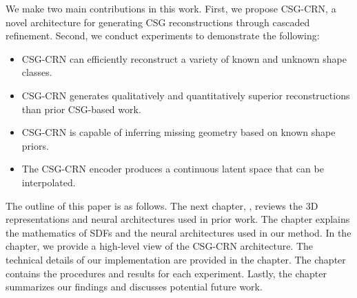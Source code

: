 We make two main contributions in this work. First, we propose CSG-CRN, a novel architecture for generating CSG reconstructions through cascaded refinement. Second, we conduct experiments to demonstrate the following:

\begin{itemize}
	\item CSG-CRN can efficiently reconstruct a variety of known and unknown shape classes.
	\item CSG-CRN generates qualitatively and quantitatively superior reconstructions than prior CSG-based work.
	\item CSG-CRN is capable of inferring missing geometry based on known shape priors.
	\item The CSG-CRN encoder produces a continuous latent space that can be interpolated.
\end{itemize}

\vspace{1em}

The outline of this paper is as follows. The next chapter, , reviews the 3D representations and neural architectures used in prior work. The  chapter explains the mathematics of SDFs and the neural architectures used in our method. In the  chapter, we provide a high-level view of the CSG-CRN architecture. The technical details of our implementation are provided in the  chapter. The  chapter contains the procedures and results for each experiment. Lastly, the  chapter summarizes our findings and discusses potential future work.
